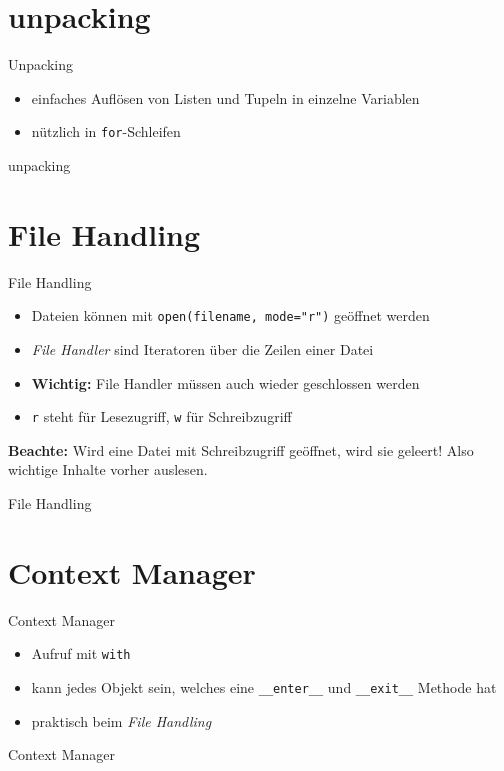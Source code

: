\section{unpacking}
\begin{frame}{Unpacking}
\begin{itemize}
	\item einfaches Aufl\"osen von Listen und Tupeln in einzelne Variablen
	\item n\"utzlich in \texttt{for}-Schleifen
\end{itemize}
\end{frame}
\begin{frame}{unpacking}
	
\end{frame}

\section{File Handling}
\begin{frame}{File Handling}
\begin{itemize}
	\item Dateien k\"onnen mit \texttt{open(filename, mode="r")} ge\"offnet werden
	\item \textit{File Handler} sind Iteratoren \"uber die Zeilen einer Datei
	\item \textbf{Wichtig:} File Handler m\"ussen auch wieder geschlossen werden
	\item \texttt{r} steht f\"ur Lesezugriff,  \texttt{w} f\"ur Schreibzugriff
\end{itemize}
\textbf{Beachte:} Wird eine Datei mit Schreibzugriff ge\"offnet, wird sie geleert! Also wichtige Inhalte vorher auslesen.
\end{frame}
\begin{frame}{File Handling}
	
\end{frame}

\section{Context Manager}
\begin{frame}{Context Manager}
\begin{itemize}
	\item Aufruf mit \texttt{with}
	\item kann jedes Objekt sein, welches eine \texttt{\_\_enter\_\_} und \texttt{\_\_exit\_\_} Methode hat
	\item praktisch beim \textit{File Handling}
\end{itemize}
\end{frame}
\begin{frame}{Context Manager}
	
\end{frame}


